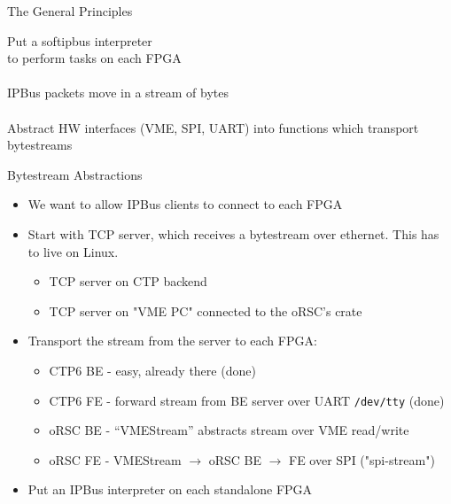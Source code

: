 \documentclass{beamer}
\begin{document}
\begin{frame}{The General Principles}
\begin{center}
{\Large 
Put a softipbus interpreter \\to perform tasks on each FPGA\\~\\
IPBus packets move in a stream of bytes\\~\\
Abstract HW interfaces (VME, SPI, UART) into functions which transport bytestreams
}
\end{center}
\end{frame}

\begin{frame}{Bytestream Abstractions}
\begin{itemize}
\item We want to allow IPBus clients to connect to each FPGA
\item Start with TCP server, which receives a bytestream over ethernet.  This has to live on Linux.
\begin{itemize}
\item TCP server on CTP backend
\item TCP server on "VME PC" connected to the oRSC's crate
\end{itemize}
\item Transport the stream from the server to each FPGA:
\begin{itemize}
\item CTP6 BE - easy, already there (done)
\item CTP6 FE - forward stream from BE server over UART {\tt /dev/tty} (done)
\item oRSC BE - ``VMEStream'' abstracts stream over VME read/write
\item oRSC FE - VMEStream $\to$ oRSC BE $\to$ FE over SPI ("spi-stream")
\end{itemize}
\item Put an IPBus interpreter on each standalone FPGA
\end{itemize}
\end{frame}
\end{document}
